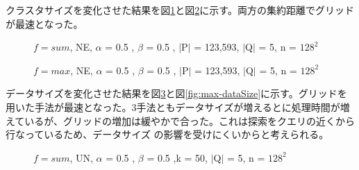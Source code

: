 \documentclass{deimj}
\begin{document}
クラスタサイズを変化させた結果を図\ref{fig:sum-clusterSize}と図\ref{fig:max-clusterSize}に示す。両方の集約距離でグリッドが最速となった。

\begin{figure}[H]
	\centering
    \caption{$f=sum$, NE, $\alpha$ = 0.5 , $\beta$ = 0.5 , $\mid$P$\mid$ = 123,593, $\mid$Q$\mid$ = 5, n = $128^2$}
    \label{fig:sum-clusterSize}
\end{figure}

\begin{figure}[H]
	\centering
    \caption{$f=max$, NE, $\alpha$ = 0.5 , $\beta$ = 0.5 , $\mid$P$\mid$ = 123,593, $\mid$Q$\mid$ = 5, n = $128^2$}
    \label{fig:max-clusterSize}
\end{figure}

データサイズを変化させた結果を図\ref{fig:sum-dataSize}と図\ref{fig:max-dataSize}に示す。グリッドを用いた手法が最速となった。3手法ともデータサイズが増えるとに処理時間が増えているが、グリッドの増加は緩やかで合った。これは探索をクエリの近くから行なっているため、データサイズ の影響を受けにくいからと考えられる。

\begin{figure}[H]
	\centering
    \caption{$f=sum$, UN, $\alpha$ = 0.5 , $\beta$ = 0.5 ,k = 50, $\mid$Q$\mid$ = 5, n = $128^2$}
    \label{fig:sum-dataSize}
\end{figure}
\end{document}
